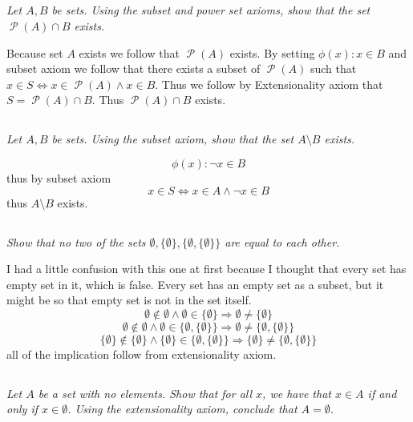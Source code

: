 \documentclass[11pt,oneside,titlepage]{book}
\DeclareMathOperator \pow {\mathcal {P}}
\DeclareMathOperator \lra {\Leftrightarrow}
\DeclareMathOperator \imp {\Rightarrow}
\begin{document}
\subsection{}

\textit{Let $A, B$ be sets. Using the subset and power set axioms, show that the set
  $\pow(A) \cap B$ exists.}

Because set $A$ exists we follow that $\pow(A)$ exists. By setting $\phi(x): x \in B$ and
subset axiom we follow that there exists a subset of $\pow(A)$ such that
$x \in S \lra x \in \pow(A) \land x \in B$. Thus we follow by Extensionality axiom
that $S = \pow(A) \cap B$. Thus $\pow(A) \cap B$ exists.

\subsection{}

\textit{Let $A, B$ be sets. Using the subset axiom, show that the set $A \setminus B$ exists.}

$$\phi(x): \neg x \in B$$
thus by subset axiom
$$x \in S \lra x \in A \land \neg x \in B$$
thus $A \setminus B$ exists.

\subsection{}

\textit{Show that no two of the sets $\emptyset, \{\emptyset\}, \{\emptyset, \{\emptyset\}\}$
  are equal to each other.}

I had a little confusion with this one at first because I thought that every set has
empty set in it, which is false. Every set has an empty set as a subset, but it
might be so that empty set is not in the set itself.
$$\emptyset \notin \emptyset \land \emptyset \in \{\emptyset\} \imp \emptyset \neq \{\emptyset\}$$
$$\emptyset \notin \emptyset \land \emptyset \in \{\emptyset, \{\emptyset\}\} \imp
\emptyset \neq \{\emptyset, \{\emptyset\}\}$$
$$\{\emptyset\} \notin \{\emptyset\} \land \{\emptyset\} \in \{\emptyset, \{\emptyset\}\} \imp
\{\emptyset\} \neq \{\emptyset, \{\emptyset\}\}$$
all of the implication follow from extensionality axiom.

\subsection{}

\textit{Let $A$ be a set with no elements. Show that for all $x$, we have that $x \in A$ if
  and only if $x \in \emptyset$. Using the extensionality axiom, conclude that $A = \emptyset$.}
\end{document}
